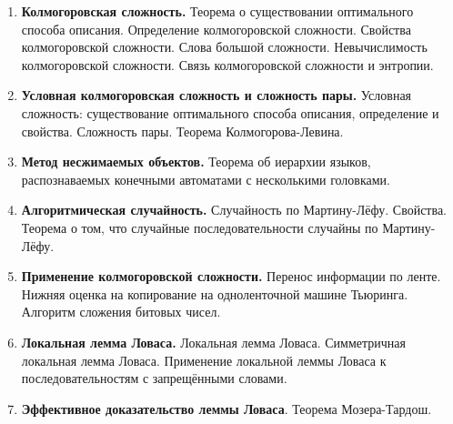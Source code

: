 \documentclass[12pt]{article}
\theoremstyle{definition}
\theoremstyle{plain}
\theoremstyle{remark}
\begin{document}
\begin{enumerate}
	\item \textbf{Колмогоровская сложность.} Теорема о существовании
	оптимального способа описания. Определение колмогоровской сложности.
	Свойства колмогоровской сложности.
	Слова большой сложности. Невычислимость колмогоровской сложности.
	Связь колмогоровской сложности и энтропии. 
	
	\item \textbf{Условная колмогоровская сложность и сложность пары.} 
	Условная сложность: существование оптимального способа описания, определение и свойства. Сложность пары. Теорема Колмогорова-Левина.
	
	\item \textbf{Метод несжимаемых объектов.} Теорема об иерархии
	языков, распознаваемых конечными автоматами 
	с несколькими головками.
	
	\item \textbf{Алгоритмическая случайность.} Случайность по Мартину-Лёфу. Свойства. Теорема о том, что случайные последовательности
	случайны по Мартину-Лёфу.
	
	\item \textbf{Применение колмогоровской сложности.} 
	Перенос информации по ленте. Нижняя оценка на копирование
	на одноленточной машине Тьюринга. 
	Алгоритм сложения битовых чисел.
	
	\item \textbf{Локальная лемма Ловаса.} Локальная лемма Ловаса.
	Симметричная локальная лемма Ловаса. Применение локальной леммы Ловаса
	к последовательностям с запрещёнными словами.
	
	\item \textbf{Эффективное доказательство леммы Ловаса}.
	Теорема Мозера-Тардош.
	
\end{enumerate}
\end{document}
